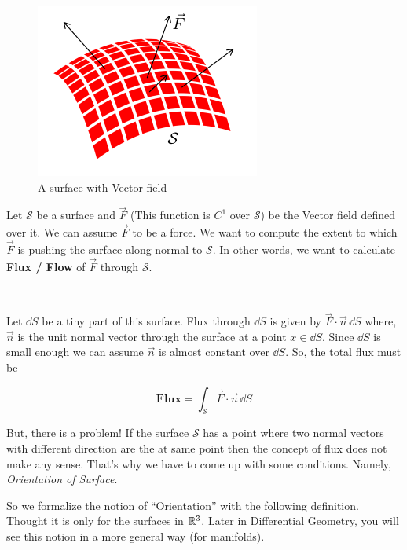 \documentclass[../Analysis-3.tex]{subfiles}
\begin{document}
\begin{tcolorbox} \label{Examp:1}

  \begin{figure}
    \centering
    \includegraphics[width=.78\linewidth]{../figures/lec-26.3.png}
    \caption{A surface with Vector field}
  \end{figure}

  Let $\mathcal{S}$ be a surface and $\vec{F}$ (This function is $C^1$ over $\mathcal{S}$) be the Vector field defined over it. We can assume $\vec{F}$ to be a force. We want to compute the extent to which $\vec{F}$ is pushing the surface along normal to $\mathcal{S}$. In other words, we want to calculate \textbf{Flux / Flow} of $\vec{F}$ through $\mathcal{S}$.

  \

  Let $\dd S$ be a tiny part of  this surface. Flux through $\dd S$ is given by $\vec{F}\cdot\vec{n}\, \dd S$ where, $\vec{n}$ is the unit normal vector through the surface at a point $x \in \dd S$. Since $\dd S$ is small enough we can assume $\vec{n}$ is almost constant over $\dd S$. So, the total flux must be

  \[ \textbf{Flux} = \int_{\mathcal{S}} \vec{F}\cdot\vec{n}\, \dd S \]

  But, there is a problem! If the surface $\mathcal{S}$ has a point where two normal vectors with different direction are the at same point then the concept of flux does not make any sense. That's why we have to come up with some conditions. Namely, \textit{Orientation of Surface}.

\end{tcolorbox}

So we formalize the notion of ``Orientation'' with the following definition. Thought it is only for the surfaces in $ \mathbb{R}^3 $. Later in Differential Geometry, you will see this notion in a more general way (for manifolds).
\end{document}
